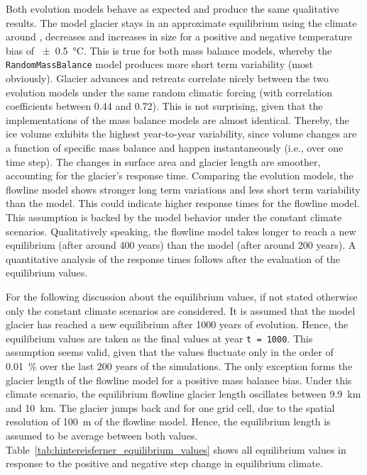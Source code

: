         Both evolution models behave as expected and produce the same qualitative results. The model glacier stays in an approximate equilibrium using the climate around \tstar, decreases and increases in size for a positive and negative temperature bias of \SI{\pm0.5}{\celsius}. This is true for both mass balance models, whereby the \lstinline`RandomMassBalance` model produces more short term variability (most obviously).
        Glacier advances and retreats correlate nicely between the two evolution models under the same random climatic forcing (with correlation coefficients between 0.44 and 0.72). This is not surprising, given that the implementations of the mass balance models are almost identical. Thereby, the ice volume exhibits the highest year-to-year variability, since volume changes are a function of specific mass balance and happen instantaneously (i.e., over one time step). The changes in surface area and glacier length are smoother, accounting for the glacier's response time.
        Comparing the evolution models, the flowline model shows stronger long term variations and less short term variability than the \vas{} model. This could indicate higher response times for the flowline model. This assumption is backed by the model behavior under the constant climate scenarios. Qualitatively speaking, the flowline model takes longer to reach a new equilibrium (after around 400 years) than the \vas{} model (after around 200 years). A quantitative analysis of the response times follows after the evaluation of the equilibrium values.


        For the following discussion about the equilibrium values, if not stated otherwise only the constant climate scenarios are considered. It is assumed that the model glacier has reached a new equilibrium after 1000 years of evolution. Hence, the equilibrium values are taken as the final values at year \lstinline`t = 1000`. This assumption seems valid, given that the values fluctuate only in the order of \SI{0.01}{\percent} over the last 200 years of the simulations.
        The only exception forms the glacier length of the flowline model for a positive mass balance bias. Under this climate scenario, the equilibrium flowline glacier length oscillates between \SI{9.9}{\kilo\meter} and \SI{10}{\kilo\meter}. The glacier jumps back and for one grid cell, due to the spatial resolution of \SI{100}{\meter} of the flowline model. Hence, the equilibrium length is assumed to be average between both values. Table~\ref{tab:hintereisferner_equilibrium_values} shows all equilibrium values in response to the positive and negative step change in equilibrium climate.
        
